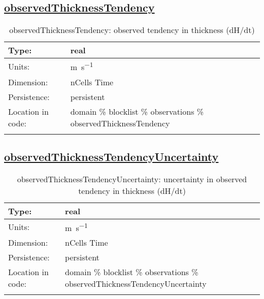\subsection[observedThicknessTendency]{\hyperref[sec:var_tab_observations]{observedThicknessTendency}}
\label{subsec:var_sec_observations_observedThicknessTendency}
\begin{center}
\begin{longtable}{| p{2.0in} | p{4.0in} |}
        \hline 
        Type: & real \\
        \hline 
        Units: & \si{m.s^{-1}} \\
        \hline 
        Dimension: & nCells Time \\
        \hline 
        Persistence: & persistent \\
        \hline 
         Location in code: & domain \% blocklist \% observations \% observedThicknessTendency \\
         \hline 
    \caption{observedThicknessTendency: observed tendency in thickness (dH/dt)}
\end{longtable}
\end{center}
\subsection[observedThicknessTendencyUncertainty]{\hyperref[sec:var_tab_observations]{observedThicknessTendencyUncertainty}}
\label{subsec:var_sec_observations_observedThicknessTendencyUncertainty}
\begin{center}
\begin{longtable}{| p{2.0in} | p{4.0in} |}
        \hline 
        Type: & real \\
        \hline 
        Units: & \si{m.s^{-1}} \\
        \hline 
        Dimension: & nCells Time \\
        \hline 
        Persistence: & persistent \\
        \hline 
         Location in code: & domain \% blocklist \% observations \% observedThicknessTendencyUncertainty \\
         \hline 
    \caption{observedThicknessTendencyUncertainty: uncertainty in observed tendency in thickness (dH/dt)}
\end{longtable}
\end{center}
